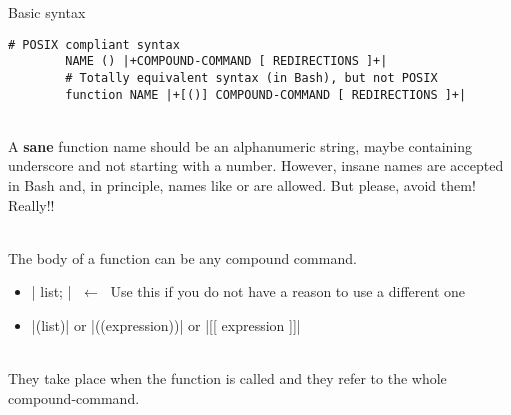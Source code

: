 \begin{frame}[fragile]{Basic syntax}
    \vspace{-2mm}
    \begin{lstlisting}[style=MyBash, numbers=none]
        # POSIX compliant syntax
        NAME () |+COMPOUND-COMMAND [ REDIRECTIONS ]+|
        # Totally equivalent syntax (in Bash), but not POSIX
        function NAME |+[()] COMPOUND-COMMAND [ REDIRECTIONS ]+|
    \end{lstlisting}
    \vspace{1mm}
    \begin{description}[X]
        \setlength{\itemsep}{3mm}
        \item[\textbf{NAME:}] ~\\
            A \textbf{sane} function name should be an alphanumeric string, maybe containing underscore and not starting with a number.
            However, insane names are accepted in Bash and, in principle, names like \PB{\texttt{:}} or \PB{\texttt{[\}\{}} are allowed.
            But please, avoid them! Really!! 
        \item[\textbf{COMPOUND-COMMAND:}] ~\\
            The body of a function can be any compound command.
            \begin{itemize}
                \item \bash|{ list; }| \alert{$\;\longleftarrow\;$ Use this if you do not have a reason to use a different one}
                \item \bash|(list)| or \bash|((expression))| or \bash|[[ expression ]]|
            \end{itemize}
        \item[\textbf{REDIRECTIONS:}] ~\\
            They take place when the function is called and they refer to the whole compound-command.
    \end{description}
\end{frame}
